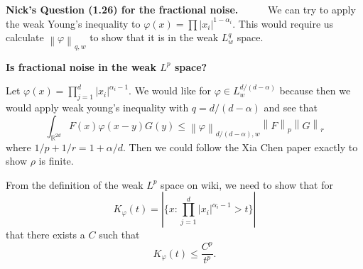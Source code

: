 \documentclass[a4paper,11pt]{article}
\numberwithin{equation}{section}
\theoremstyle{plain}
\theoremstyle{definition}
\newcommand{\Norm}[1]{\left\|  #1   \right\|}
\newcommand{\R}{\mathbb{R}}
\newcounter{NQ}
\newenvironment{NickQuestion}[1][] %
{\refstepcounter{NQ}
	\begin{mdframed}[backgroundcolor=lightgray]\textbf{Nick's Question \theNQ \: #1~~}~~~\noindent}%
	{\end{mdframed}}
\numberwithin{NQ}{section}
\numberwithin{LQ}{section}
\numberwithin{ZQ}{section}
\begin{document}
\begin{NickQuestion}[(1.26) for the fractional noise.]
		We can try to apply the weak Young's inequality to $\varphi(x) = \prod |x_i|^{1-\alpha_i}$. This would require us calculate $\Norm{\varphi}_{q,w}$ to show that it is in the weak $L^q_w$ space.

		\noindent \textbf{Is fractional noise in the weak $L^p$ space?}

		Let $\varphi(x) = \prod_{j = 1}^d|x_i|^{\alpha_i-1}$. We would like for $\varphi \in L^{d/(d-\alpha)}_w$ because then we would apply weak young's inequality with $q= d/(d-\alpha)$ and see that
		\[
		\int_{\R^{2d}} F(x)\varphi(x-y)G(y) \le \Norm{\varphi}_{d/(d-\alpha) , w} \Norm{F}_{p}  \Norm{G}_r
		\]
		where $1/p + 1/r =1 + \alpha / d$. Then we could follow the Xia Chen paper exactly to show $\rho$ is finite.

		From the definition of the weak $L^p$ space on wiki, we need to show that for
		\[
		K_\varphi(t) = \left| \{ x: \prod_{j = 1}^d|x_i|^{\alpha_i-1} > t \} \right|
		\]
		that there exists a $C$ such that
		\[
		K_\varphi(t) \le \frac{C^p}{t^p}.
		\]

	\end{NickQuestion}
\end{document}
